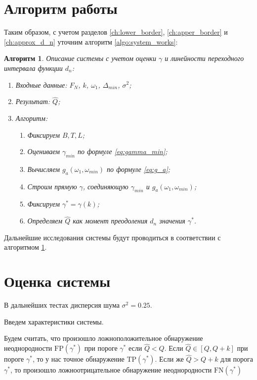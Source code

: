 \documentclass[specialist, substylefile = spbu.rtx,
			   subf, href, 12pt]{disser}
\newtheorem{algorithm}{Алгоритм}
\begin{document}
\section{Алгоритм работы}
Таким образом, с учетом разделов \ref{ch:lower_border}, \ref{ch:apper_border} и \ref{ch:approx_d_n} уточним алгоритм \ref{algo:system_works}:

\begin{algorithm}\label{algo:system_works_final}
	Описание системы с учетом оценки $ \gamma $ и линейности переходного интервала функции $ d_n $:
	\begin{enumerate}
		\item Входные данные: $ F_N $, $ k $, $ \omega_1 $, $ \Delta_{min} $, $ \sigma^2 $;
		\item Результат: $ \hat{Q }$;
		\item Алгоритм:
		\begin{enumerate}
			\item Фиксируем $ B, T, L $;
			\item Оцениваем $ \gamma_{min} $ по формуле \eqref{eq:gamma_min};
			\item Вычисляем $ g_a(\omega_1, \omega_{min}) $ по формуле \eqref{eq:g_a};
			\item Строим прямую $ \gamma $, соединяющую $ \gamma_{min} $ и $ g_a(\omega_1, \omega_{min}) $;
			\item Фиксируем $ \gamma^* = \gamma(k) $;
			\item Определяем $ \hat{Q} $ как момент преодоления $ d_n $ значения $ \gamma^* $.
		\end{enumerate}	
	\end{enumerate}
\end{algorithm}

Дальнейшие исследования системы будут проводиться в соответствии с алгоритмом \ref{algo:system_works_final}.

\section{Оценка системы}
В дальнейших тестах дисперсия шума $ \sigma^2 = 0.25 $. 

Введем характеристики системы.

Будем считать, что произошло ложноположительное обнаружение неоднородности $ \mathrm{FP}(\gamma^*) $ при пороге $ \gamma^* $ если $ \hat{Q} < Q $. Если $ \hat{Q} \in [Q, Q+k] $ при пороге $ \gamma^* $, то у нас точное обнаружение $ \mathrm{TP}(\gamma^*) $. Если же $ \hat{Q} > Q+k $ для порога $ \gamma^* $, то произошло ложноотрицательное обнаружение неоднородности $ \mathrm{FN}(\gamma^*) $
\end{document}
